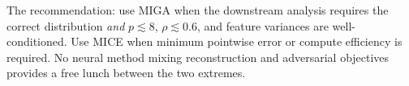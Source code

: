 The recommendation: use MIGA when the downstream analysis requires the correct distribution \emph{and} $p \lesssim 8$, $\rho \lesssim 0.6$, and feature variances are well-conditioned. Use MICE when minimum pointwise error or compute efficiency is required. No neural method mixing reconstruction and adversarial objectives provides a free lunch between the two extremes.
